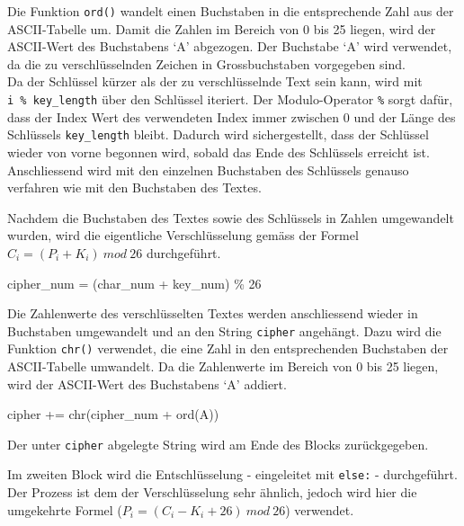 \documentclass[
  nswissgerman,
  a4paper,
  DIV=11,
  numbers=noendperiod,
  ngerman]{scrreprt}
\newenvironment{Shaded}{\begin{snugshade}}{\end{snugshade}}
\newcommand{\BuiltInTok}[1]{\textcolor[rgb]{0.00,0.23,0.31}{#1}}
\newcommand{\DecValTok}[1]{\textcolor[rgb]{0.68,0.00,0.00}{#1}}
\newcommand{\NormalTok}[1]{\textcolor[rgb]{0.00,0.23,0.31}{#1}}
\newcommand{\OperatorTok}[1]{\textcolor[rgb]{0.37,0.37,0.37}{#1}}
\newcommand{\StringTok}[1]{\textcolor[rgb]{0.13,0.47,0.30}{#1}}
\begin{document}
Die Funktion \texttt{ord()} wandelt einen Buchstaben in die
entsprechende Zahl aus der ASCII-Tabelle um. Damit die Zahlen im Bereich
von 0 bis 25 liegen, wird der ASCII-Wert des Buchstabens `A' abgezogen.
Der Buchstabe `A' wird verwendet, da die zu verschlüsselnden Zeichen in
Grossbuchstaben vorgegeben sind.\\
Da der Schlüssel kürzer als der zu verschlüsselnde Text sein kann, wird
mit \texttt{i\ \%\ key\_length} über den Schlüssel iteriert. Der
Modulo-Operator \texttt{\%} sorgt dafür, dass der Index Wert des
verwendeten Index immer zwischen 0 und der Länge des Schlüssels
\texttt{key\_length} bleibt. Dadurch wird sichergestellt, dass der
Schlüssel wieder von vorne begonnen wird, sobald das Ende des Schlüssels
erreicht ist. Anschliessend wird mit den einzelnen Buchstaben des
Schlüssels genauso verfahren wie mit den Buchstaben des Textes.

Nachdem die Buchstaben des Textes sowie des Schlüssels in Zahlen
umgewandelt wurden, wird die eigentliche Verschlüsselung gemäss der
Formel \(C_i = (P_i + K_i)\ mod\ 26\) durchgeführt.

\begin{Shaded}
\begin{Highlighting}[numbers=left,,]
\NormalTok{    cipher\_num }\OperatorTok{=}\NormalTok{ (char\_num }\OperatorTok{+}\NormalTok{ key\_num) }\OperatorTok{\%} \DecValTok{26}
\end{Highlighting}
\end{Shaded}

Die Zahlenwerte des verschlüsselten Textes werden anschliessend wieder
in Buchstaben umgewandelt und an den String \texttt{cipher} angehängt.
Dazu wird die Funktion \texttt{chr()} verwendet, die eine Zahl in den
entsprechenden Buchstaben der ASCII-Tabelle umwandelt. Da die
Zahlenwerte im Bereich von 0 bis 25 liegen, wird der ASCII-Wert des
Buchstabens `A' addiert.

\begin{Shaded}
\begin{Highlighting}[numbers=left,,]
\NormalTok{    cipher }\OperatorTok{+=} \BuiltInTok{chr}\NormalTok{(cipher\_num }\OperatorTok{+} \BuiltInTok{ord}\NormalTok{(}\StringTok{\textquotesingle{}A\textquotesingle{}}\NormalTok{))}
\end{Highlighting}
\end{Shaded}

Der unter \texttt{cipher} abgelegte String wird am Ende des Blocks
zurückgegeben.

Im zweiten Block wird die Entschlüsselung - eingeleitet mit
\texttt{else:} - durchgeführt. Der Prozess ist dem der Verschlüsselung
sehr ähnlich, jedoch wird hier die umgekehrte Formel
(\(P_i = (C_i - K_i + 26)\ mod\
26\)) verwendet.
\end{document}
